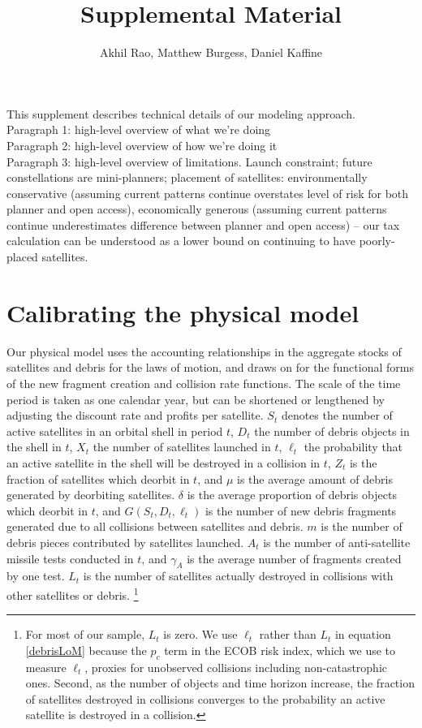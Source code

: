 \documentclass[12pt]{article}
\title{Supplemental Material}
\author{Akhil Rao, Matthew Burgess, Daniel Kaffine}
\begin{document}
	
	\maketitle

This supplement describes technical details of our modeling approach. \\

Paragraph 1: high-level overview of what we're doing \\

Paragraph 2: high-level overview of how we're doing it \\

Paragraph 3: high-level overview of limitations. Launch constraint; future constellations are mini-planners; placement of satellites: environmentally conservative (assuming current patterns continue overstates level of risk for both planner and open access), economically generous (assuming current patterns continue underestimates difference between planner and open access) -- our tax calculation can be understood as a lower bound on continuing to have poorly-placed satellites.


\section{Calibrating the physical model}	

Our physical model uses the accounting relationships in the aggregate stocks of satellites and debris for the laws of motion, and draws on \citep{bradleywein2009} for the functional forms of the new fragment creation and collision rate functions. The scale of the time period is taken as one calendar year, but can be shortened or lengthened by adjusting the discount rate and profits per satellite. $S_t$ denotes the number of active satellites in an orbital shell in period $t$, $D_t$ the number of debris objects in the shell in $t$, $X_t$ the number of satellites launched in $t$, $\ell_t$ the probability that an active satellite in the shell will be destroyed in a collision in $t$, $Z_t$ is the fraction of satellites which deorbit in $t$, and $\mu$ is the average amount of debris generated by deorbiting satellites. $\delta$ is the average proportion of debris objects which deorbit in $t$, and $G(S_t,D_t,\ell_t)$ is the number of new debris fragments generated due to all collisions between satellites and debris. $m$ is the number of debris pieces contributed by satellites launched. $A_t$ is the number of anti-satellite missile tests conducted in $t$, and $\gamma_A$ is the average number of fragments created by one test. $L_t$ is the number of satellites actually destroyed in collisions with other satellites or debris. \footnote{For most of our sample, $L_t$ is zero. We use $\ell_t$ rather than $L_t$ in equation \ref{debrisLoM} because the $p_c$ term in the ECOB risk index, which we use to measure $\ell_t$, proxies for unobserved collisions including non-catastrophic ones. Second, as the number of objects and time horizon increase, the fraction of satellites destroyed in collisions converges to the probability an active satellite is destroyed in a collision.}\\
\end{document}
